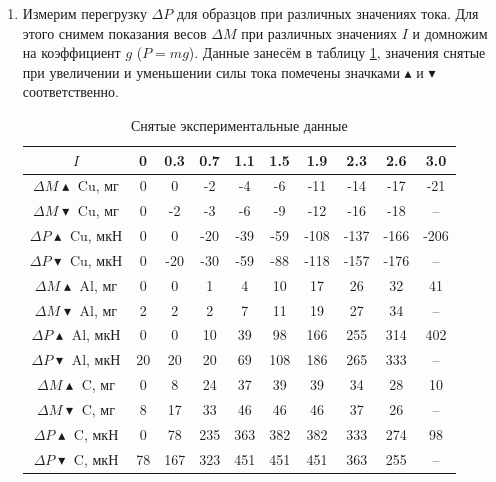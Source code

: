\documentclass[a4paper,12pt]{article}
\begin{document}
\begin{enumerate}
\item  Измерим перегрузку $\Delta P$ для образцов при различных значениях тока. Для этого снимем показания весов $\Delta M$ при различных значениях $I$ и домножим на коэффициент $g$ ($P = mg$). Данные занесём в таблицу \ref{tab:measure}, значения снятые при увеличении и уменьшении силы тока помечены значками $\blacktriangle$ и $\blacktriangledown$ соответственно.

\begin{table}[h]
\begin{center}
\begin{tabular}{|c||c|c|c|c|c|c|c|c|c|}
\hline 
$I$ & 0 & 0.3 & 0.7 & 1.1 & 1.5 & 1.9 & 2.3 & 2.6 & 3.0 \\ 
\hline 
$\Delta M \blacktriangle$ Cu, мг & 0 & 0 & -2 & -4 & -6 & -11 & -14 & -17 & -21 \\ 
\hline 
$\Delta M \blacktriangledown$ Cu, мг & 0 & -2 & -3 & -6 & -9 & -12 & -16 & -18 & -- \\ 
\hline 
$\Delta P \blacktriangle$ Cu, мкН & 0 & 0 & -20 & -39 & -59 & -108 & -137 & -166 & -206 \\ 
\hline 
$\Delta P \blacktriangledown$ Cu, мкН & 0 & -20 & -30 & -59 & -88 & -118 & -157 & -176 & -- \\ 
\hline 
$\Delta M \blacktriangle$ Al, мг & 0 & 0 & 1 & 4 & 10 & 17 & 26 & 32 & 41 \\ 
\hline 
$\Delta M \blacktriangledown$ Al, мг & 2 & 2 & 2 & 7 & 11 & 19 & 27 & 34 & -- \\ 
\hline 
$\Delta P \blacktriangle$ Al, мкН & 0 & 0 & 10 & 39 & 98 & 166 & 255 & 314 & 402 \\ 
\hline 
$\Delta P \blacktriangledown$ Al, мкН & 20 & 20 & 20 & 69 & 108 & 186 & 265 & 333 & -- \\ 
\hline 
$\Delta M \blacktriangle$ C, мг & 0 & 8 & 24 & 37 & 39 & 39 & 34 & 28 & 10 \\ 
\hline 
$\Delta M \blacktriangledown$ C, мг & 8 & 17 & 33 & 46 & 46 & 46 & 37 & 26 & -- \\ 
\hline 
$\Delta P \blacktriangle$ C, мкН & 0 & 78 & 235 & 363 & 382 & 382 & 333 & 274 & 98 \\ 
\hline 
$\Delta P \blacktriangledown$ C, мкН & 78 & 167 & 323 & 451 & 451 & 451 & 363 & 255 & -- \\ 
\hline 
\end{tabular} 
\caption{Снятые экспериментальные данные}
\label{tab:measure}
\end{center}
\end{table}


\end{enumerate}
\end{document}
